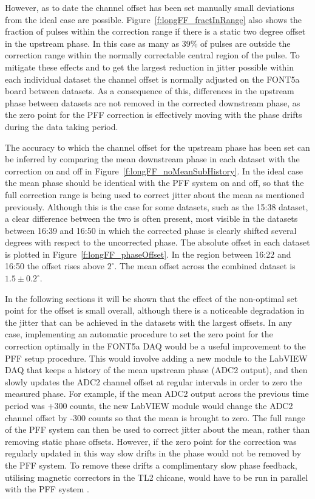 However, as to date the channel offset has been set manually small deviations from the ideal case are possible. Figure~\ref{f:longFF_fractInRange} also shows the fraction of pulses within the correction range if there is a static two degree offset in the upstream phase. In this case as many as 39\% of pulses are outside the correction range within the normally correctable central region of the pulse. To mitigate these effects and to get the largest reduction in jitter possible within each individual dataset the channel offset is normally adjusted on the FONT5a board between datasets. As a consequence of this, differences in the upstream phase between datasets are not removed in the corrected downstream phase, as the zero point for the PFF correction is effectively moving with the phase drifts during the data taking period. %

The accuracy to which the channel offset for the upstream phase has been set can be inferred by comparing the mean downstream phase in each dataset with the correction on  and off in Figure~\ref{f:longFF_noMeanSubHistory}. In the ideal case the mean phase should be identical with the PFF system on and off, so that the full correction range is being used to correct jitter about the mean as mentioned previously. Although this is the case for some datasets, such as the 15:38 dataset, a clear difference between the two is often present, most visible in the datasets between 16:39 and 16:50 in which the corrected phase is clearly shifted several degrees with respect to the uncorrected phase. The absolute offset in each dataset is plotted in Figure~\ref{f:longFF_phaseOffset}. In the region between 16:22 and 16:50 the offset rises above \(2^\circ\). The mean offset across the combined dataset is \(1.5\pm0.2^\circ\). 

In the following sections it will be shown that the effect of the non-optimal set point for the offset is small overall, although there is a noticeable degradation in the jitter that can be achieved in the datasets with the largest offsets. In any case, implementing an automatic procedure to set the zero point for the correction optimally in the FONT5a DAQ would be a useful improvement to the PFF setup procedure. This would involve adding a new module to the LabVIEW DAQ that keeps a history of the mean upstream phase (ADC2 output), and then slowly updates the ADC2 channel offset at regular intervals in order to zero the measured phase. For example, if the mean ADC2 output across the previous time period was +300 counts, the new LabVIEW module would change the ADC2 channel offset by -300 counts so that the mean is brought to zero. The full range of the PFF system can then be used to correct jitter about the mean, rather than removing static phase offsets. However, if the zero point for the correction was regularly updated in this way slow drifts in the phase would not be removed by the PFF system. To remove these drifts a complimentary slow phase feedback, utilising magnetic correctors in the TL2 chicane, would have to be run in parallel with the PFF system \cite{jackLCWS14}.

